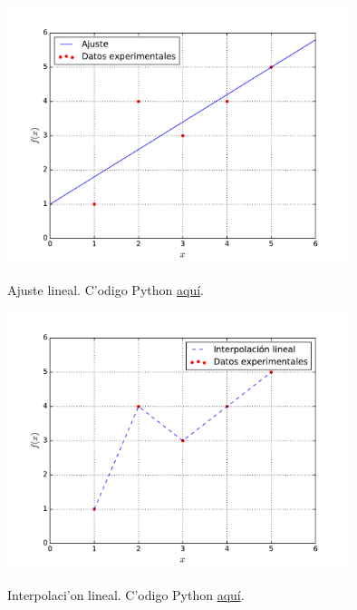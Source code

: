 \documentclass[letterpaper,11pt]{report}
\begin{document}
\begin{figure}[h!]
\begin{center}
\includegraphics[width=10cm]{figs/fig-mmc.pdf}\label{intmc}
\caption{Ajuste lineal. C'odigo Python \href{https://github.com/gfrubi/Lab/blob/master/python/fig-mmc.py}{aqu\'i}.}
\end{center}
\end{figure}

\begin{figure}[h!]
\begin{center}
\includegraphics[width=10cm]{figs/fig-int-lineal.pdf}\label{intil}
\caption{Interpolaci'on lineal. C'odigo Python \href{https://github.com/gfrubi/Lab/blob/master/python/fig-int-lineal.py}{aqu\'i}.}
\end{center}
\end{figure}
\end{document}
